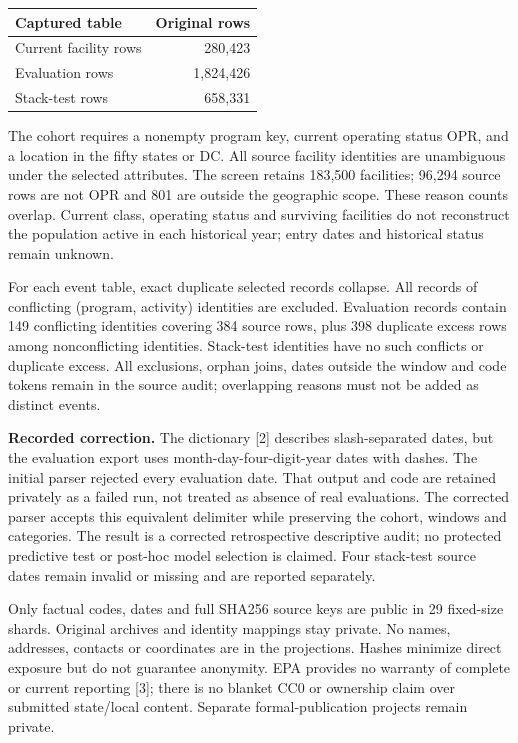 \documentclass[10pt,letterpaper]{article}
\begin{document}
\begin{center}\begin{tabular}{lr}\toprule
Captured table & Original rows\\\midrule
Current facility rows & 280,423 \\
Evaluation rows & 1,824,426 \\
Stack-test rows & 658,331 \\
\bottomrule\end{tabular}\end{center}

The cohort requires a nonempty program key, current operating status OPR, and a location in the fifty states or DC. All source facility identities are unambiguous under the selected attributes. The screen retains 183,500 facilities; 96,294 source rows are not OPR and 801 are outside the geographic scope. These reason counts overlap. Current class, operating status and surviving facilities do not reconstruct the population active in each historical year; entry dates and historical status remain unknown.

For each event table, exact duplicate selected records collapse. All records of conflicting (program, activity) identities are excluded. Evaluation records contain 149 conflicting identities covering 384 source rows, plus 398 duplicate excess rows among nonconflicting identities. Stack-test identities have no such conflicts or duplicate excess. All exclusions, orphan joins, dates outside the window and code tokens remain in the source audit; overlapping reasons must not be added as distinct events.

\textbf{Recorded correction.} The dictionary [2] describes slash-separated dates, but the evaluation export uses month-day-four-digit-year dates with dashes. The initial parser rejected every evaluation date. That output and code are retained privately as a failed run, not treated as absence of real evaluations. The corrected parser accepts this equivalent delimiter while preserving the cohort, windows and categories. The result is a corrected retrospective descriptive audit; no protected predictive test or post-hoc model selection is claimed. Four stack-test source dates remain invalid or missing and are reported separately.

Only factual codes, dates and full SHA256 source keys are public in 29 fixed-size shards. Original archives and identity mappings stay private. No names, addresses, contacts or coordinates are in the projections. Hashes minimize direct exposure but do not guarantee anonymity. EPA provides no warranty of complete or current reporting [3]; there is no blanket CC0 or ownership claim over submitted state/local content. Separate formal-publication projects remain private.
\end{document}
